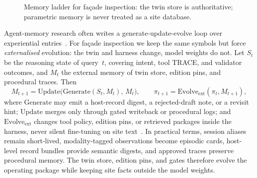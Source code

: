 \begin{figure}[htbp]
\centering
{}
\caption{Memory ladder for fa\c{c}ade inspection: the twin store is authoritative; parametric memory is never treated as a site database.}
\label{fig:ch8-memory-ladder}
\end{figure}

Agent-memory research often writes a generate-update-evolve loop over experiential entries~\cite{park2023generativeagents,yao2023react,wang2024surveyagents}. For fa\c{c}ade inspection we keep the same symbols but force \emph{externalised} evolution: the twin and harness change, model weights do not. Let $S_t$ be the reasoning state of query~$t$, covering intent, tool TRACE, and validator outcomes, and $M_t$ the external memory of twin store, edition pins, and procedural traces. Then
\begin{equation}
\label{eq:ch8-mem-loop}
M_{t+1}=\mathrm{Update}\!\bigl(\mathrm{Generate}(S_t,M_t),\,M_t\bigr),\qquad
\pi_{t+1}=\mathrm{Evolve}_{\mathrm{ext}}(\pi_t,M_{t+1}),
\end{equation}
where $\mathrm{Generate}$ may emit a host-record digest, a rejected-draft note, or a revisit hint; $\mathrm{Update}$ merges only through gated writeback or procedural logs; and $\mathrm{Evolve}_{\mathrm{ext}}$ changes tool policy, edition pins, or retrieved packages inside the harness, never silent fine-tuning on site text~\cite{lewis2020,luo2025llmdtrobot,gao2026ifcagent}. In practical terms, session aliases remain short-lived, modality-tagged observations become episodic cards, host-level record bundles provide semantic digests, and approved traces preserve procedural memory. The twin store, edition pins, and gates therefore evolve the operating package while keeping site facts outside the model weights.

